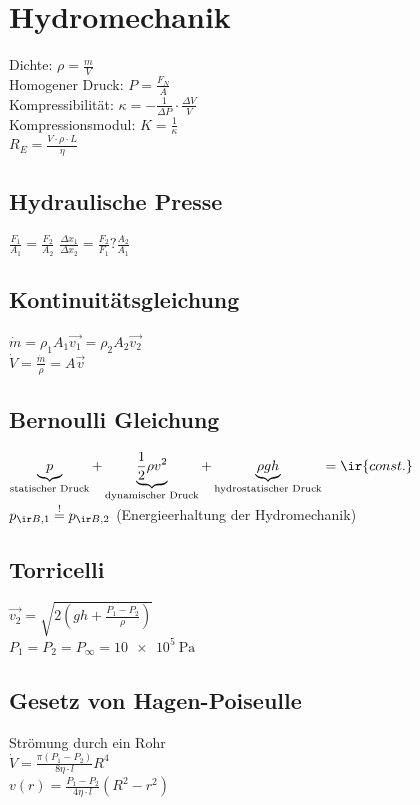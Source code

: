 \documentclass[german]{latex4ei/latex4ei_sheet}
\begin{document}
\section{Hydromechanik}
\begin{sectionbox}
Dichte: $\rho=\frac{m}{V}$\\
Homogener Druck: $P=\frac{F_N}{A}$\\
Kompressibilität: $\kappa = -\frac{1}{\Delta P}\cdot \frac{\Delta V}{V}$\\
Kompressionsmodul: $K=\frac{1}{\kappa}$\\
$R_E= \frac{V\cdot \rho \cdot L}{\eta}$

\subsection{Hydraulische Presse}
$\frac{F_1}{A_1}=\frac{F_2}{A_2}$
$\frac{\Delta x_1}{\Delta x_2}=\frac{F_2}{F_1}?\frac{A_2}{A_1}$
\subsection{Kontinuitätsgleichung}
$\dot{m}=\rho_1 A_1 \vec{v_1}=\rho_2 A_2 \vec{v_2}$\\
$\dot{V}=\frac{\dot{m}}{\rho}=A\vec{v}$

\subsection{Bernoulli Gleichung}
$\underbrace{p}_{\text{statischer Druck}} 
+ \underbrace{\frac{1}{2} \rho v^2}_{\text{dynamischer Druck}} 
+ \underbrace{\rho gh}_{\text{hydrostatischer Druck}} = \ir{const.}$\\
$p_{\ir B,1}\stackrel{!}{=}p_{\ir B,2}$
(Energieerhaltung der Hydromechanik)

\subsection{Torricelli}
$\vec{v_2}=\sqrt{2(gh+\frac{P_1-P_2}{\rho})}$\\
$P_1=P_2=P_\infty = \SI{10e5}{\pascal}$

\subsection{Gesetz von Hagen-Poiseulle}
Strömung durch ein Rohr\\
$\dot{V}=\frac{\pi (P_1-P_2)}{8\eta \cdot l}R^4$\\
$v(r)=\frac{P_1-P_2}{4\eta \cdot l}(R^2-r^2)$


\end{sectionbox}
\end{document}
